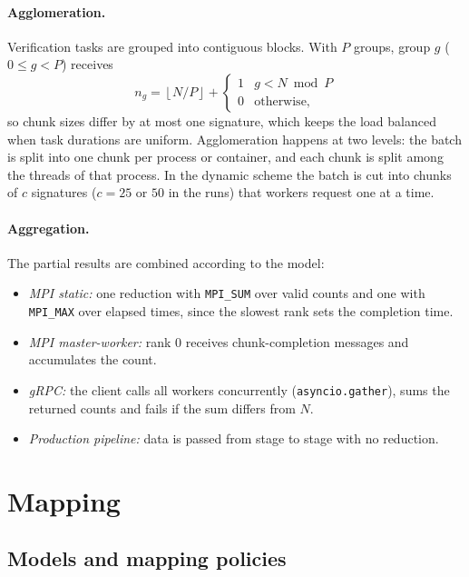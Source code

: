 \documentclass[10pt,a4paper]{article}
\begin{document}
\paragraph{Agglomeration.} Verification tasks are grouped into contiguous blocks. With $P$ groups, group $g$ ($0\le g<P$) receives
\begin{equation}
n_g = \left\lfloor N/P \right\rfloor + \begin{cases}1 & g < N \bmod P\\ 0 & \text{otherwise,}\end{cases}
\end{equation}
so chunk sizes differ by at most one signature, which keeps the load balanced when task durations are uniform. Agglomeration happens at two levels: the batch is split into one chunk per process or container, and each chunk is split among the threads of that process. In the dynamic scheme the batch is cut into chunks of $c$ signatures ($c=25$ or $50$ in the runs) that workers request one at a time.

\paragraph{Aggregation.} The partial results are combined according to the model:
\begin{itemize}
  \item \emph{MPI static:} one reduction with \texttt{MPI\_SUM} over valid counts and one with \texttt{MPI\_MAX} over elapsed times, since the slowest rank sets the completion time.
  \item \emph{MPI master-worker:} rank 0 receives chunk-completion messages and accumulates the count.
  \item \emph{gRPC:} the client calls all workers concurrently (\texttt{asyncio.gather}), sums the returned counts and fails if the sum differs from $N$.
  \item \emph{Production pipeline:} data is passed from stage to stage with no reduction.
\end{itemize}

\section{Mapping}\label{sec:mapping}

\subsection{Models and mapping policies}
\end{document}
